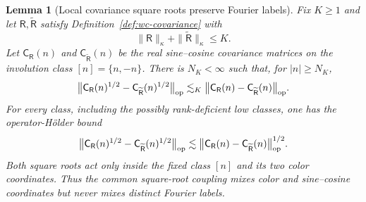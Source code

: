 \documentclass[10pt]{amsart}
\numberwithin{equation}{section}
\theoremstyle{plain}
\newtheorem{lemma}[theorem]{Lemma}
\theoremstyle{definition}
\theoremstyle{remark}
\begin{document}
\begin{lemma}[Local covariance square roots preserve Fourier labels]\label{lem:wc-square-root-locality}
Fix $K\ge1$ and let $\mathsf R,\widetilde{\mathsf R}$ satisfy
Definition~\ref{def:wc-covariance} with
\[
        \|\mathsf R\|_\kappa+
        \|\widetilde{\mathsf R}\|_\kappa\le K.
\]
Let $\mathsf C_{\mathsf R}(n)$ and
$\mathsf C_{\widetilde{\mathsf R}}(n)$ be the real sine--cosine covariance
matrices on the involution class $[n]=\{n,-n\}$.  There is $N_K<\infty$ such
that, for $|n|\ge N_K$,
\begin{equation}\label{eq:wc-high-square-root-lipschitz}
 \bigl\|\mathsf C_{\mathsf R}(n)^{1/2}
       -\mathsf C_{\widetilde{\mathsf R}}(n)^{1/2}\bigr\|_{\rm op}
 \lesssim_K
 \bigl\|\mathsf C_{\mathsf R}(n)
       -\mathsf C_{\widetilde{\mathsf R}}(n)\bigr\|_{\rm op}.
\end{equation}
For every class, including the possibly rank-deficient low classes, one has the
operator-H\"older bound
\begin{equation}\label{eq:wc-low-square-root-modulus}
 \bigl\|\mathsf C_{\mathsf R}(n)^{1/2}
       -\mathsf C_{\widetilde{\mathsf R}}(n)^{1/2}\bigr\|_{\rm op}
 \lesssim
       \bigl\|\mathsf C_{\mathsf R}(n)
       -\mathsf C_{\widetilde{\mathsf R}}(n)\bigr\|_{\rm op}^{1/2}.
\end{equation}
Both square roots act only inside the fixed class $[n]$ and its two color
coordinates.  Thus the common square-root coupling mixes color and
sine--cosine coordinates but never mixes distinct Fourier labels.
\end{lemma}
\end{document}
